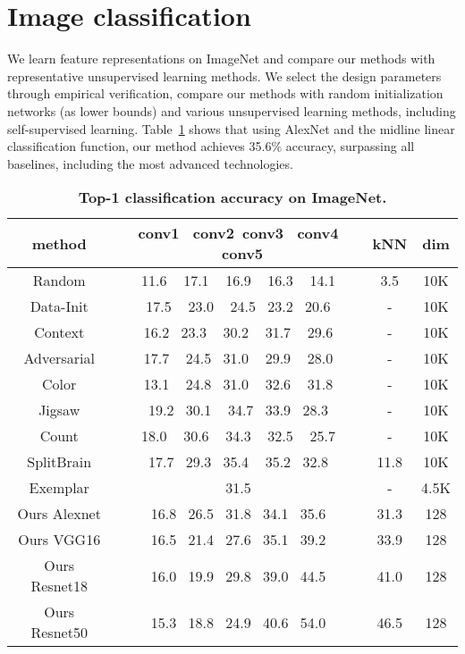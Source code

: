 \documentclass[a4paper,12pt]{article}
\begin{document}
 \section{Image classification} 
 We learn feature representations on ImageNet and compare our methods with representative unsupervised learning methods. We select the design parameters through empirical verification, compare our methods with random initialization networks (as lower bounds) and various unsupervised learning methods, including self-supervised learning\cite{Wang_2015_Unsupervised}. Table~\ref{table1} shows that using AlexNet and the midline linear classification function, our method achieves 35.6\% accuracy, surpassing all baselines, including the most advanced technologies.
 	\begin{table}[h]%
 	\centering 
 	\caption{\bfseries{ Top-1 classification accuracy on ImageNet.}}\label{table1}
 	\begin{tabular}{c|c|c|c}
 		\hline
 		method& conv1 \ conv2\  conv3 \ conv4 \ conv5& kNN &dim \\
 		\hline
 		Random &11.6 ~ 17.1 ~ 16.9 ~ 16.3 ~  14.1& 3.5& 10K\\
 		Data-Init& 17.5 ~ 23.0 ~ 24.5~  23.2~  20.6 &- &10K\\
 		Context & 16.2~  23.3 ~ 30.2 ~  31.7 ~ 29.6 &- &10K\\
 		Adversarial & 17.7 ~ 24.5  ~31.0 ~ 29.9 ~ 28.0& -& 10K\\
 		Color & 13.1 ~ 24.8~  31.0 ~ 32.6 ~ 31.8 &- &10K\\
 		Jigsaw\cite{Noroozi_2016_Unsupervised} & 19.2~  30.1 ~ 34.7~  33.9~  28.3& - &10K\\
 		Count & 18.0 ~ 30.6 ~ 34.3 ~ 32.5 ~ 25.7& - &10K\\
 		SplitBrain & 17.7~  29.3~  35.4 ~ 35.2~  32.8 &11.8& 10K\\
 		\hline
 		Exemplar& 31.5& - &4.5K	 \\
 		\hline
 		Ours Alexnet& 16.8 ~26.5~ 31.8~ 34.1~ 35.6 &31.3& 128\\
 		Ours VGG16 &16.5~ 21.4~ 27.6 ~35.1~ 39.2 &33.9 &128\\
		Ours Resnet18& 16.0 ~19.9~ 29.8~ 39.0 ~44.5 &41.0 &128\\
 		Ours Resnet50& 15.3~ 18.8~ 24.9~ 40.6~ 54.0 &46.5& 128\\
 		\hline
 	\end{tabular}
 \end{table}
\end{document}
